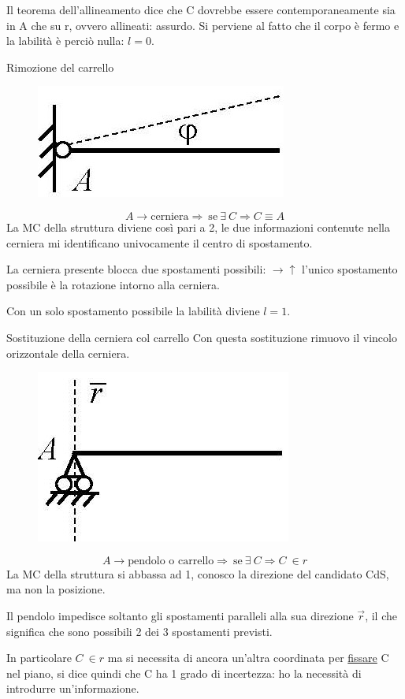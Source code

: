 \documentclass{article}
\begin{document}
\begin{adjustwidth}{2in}{}
Il teorema dell'allineamento dice che C dovrebbe essere contemporaneamente sia in A che su r, ovvero allineati: assurdo. Si perviene al fatto che il corpo è fermo e la labilità è perciò nulla: $l=0$. \newline

Rimozione del carrello \newline
\begin{figure}[H]
	\centering
	\includegraphics[width=0.15\linewidth]{immagini/1.PARTE3_Pagina_14 (3)}
\end{figure}
\[
	A \rightarrow \text{cerniera} \Rightarrow ~ \text{se} ~ \exists ~ C \Rightarrow C \equiv A
\]
La MC della struttura diviene così pari a 2, le due informazioni contenute nella cerniera mi identificano univocamente il centro di spostamento. 

La cerniera presente blocca due spostamenti possibili: $\rightarrow \uparrow$ l'unico spostamento possibile è la rotazione intorno alla cerniera.

Con un solo spostamento possibile la labilità diviene $l=1$. \newline

Sostituzione della cerniera col carrello \newline
Con questa sostituzione rimuovo il vincolo orizzontale della cerniera. 
\begin{figure}[H]
	\centering
	\includegraphics[width=0.15\linewidth]{immagini/1.PARTE3_Pagina_14}
\end{figure}
\[
A \rightarrow \text{pendolo o carrello} \Rightarrow ~ \text{se} ~ \exists ~ C \Rightarrow C ~ \in r 
\]
La MC della struttura si abbassa ad 1, conosco la direzione del candidato CdS, ma non la posizione.

Il pendolo impedisce soltanto gli spostamenti paralleli alla sua direzione $\vec{r}$, il che significa che sono possibili 2 dei 3 spostamenti previsti. 

In particolare $C ~ \in r $ ma si necessita di ancora un'altra coordinata per \underline{fissare} C nel piano, si dice quindi che C ha 1 grado di incertezza: ho la necessità di introdurre un'informazione. \newline 


\end{adjustwidth}
\end{document}
